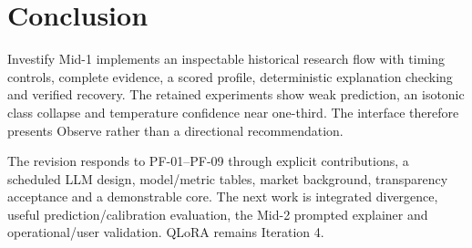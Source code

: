 \chapter{Conclusion}
Investify Mid-1 implements an inspectable historical research flow with timing controls, complete evidence, a scored profile, deterministic explanation checking and verified recovery. The retained experiments show weak prediction, an isotonic class collapse and temperature confidence near one-third. The interface therefore presents Observe rather than a directional recommendation.

The revision responds to PF-01--PF-09 through explicit contributions, a scheduled LLM design, model/metric tables, market background, transparency acceptance and a demonstrable core. The next work is integrated divergence, useful prediction/calibration evaluation, the Mid-2 prompted explainer and operational/user validation. QLoRA remains Iteration 4.
